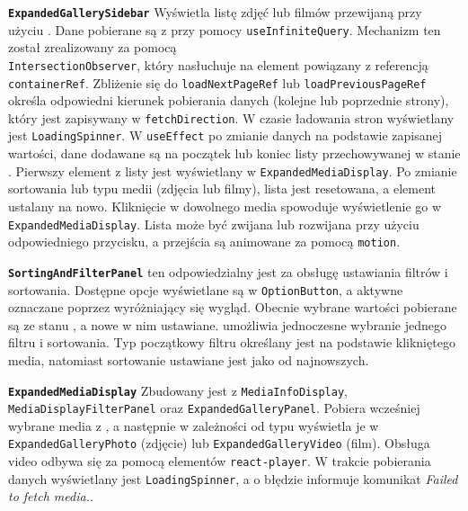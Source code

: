 \textbf{\texttt{ExpandedGallerySidebar}}
Wyświetla listę zdjęć lub filmów przewijaną przy użyciu \texttt{}.
Dane pobierane są  z  przy pomocy 
\texttt{useInfiniteQuery}.
Mechanizm ten został zrealizowany za pomocą \\ \texttt{IntersectionObserver}, który nasłuchuje na element powiązany z
referencją \newline \texttt{containerRef}.
Zbliżenie się do \texttt{loadNextPageRef} lub \texttt{loadPreviousPageRef} określa odpowiedni kierunek pobierania danych
(kolejne lub poprzednie strony), który jest zapisywany w \texttt{fetchDirection}.
W czasie ładowania stron wyświetlany jest \newline \texttt{LoadingSpinner}.
W  \texttt{useEffect} po zmianie danych na podstawie zapisanej wartości, dane dodawane
są na początek lub koniec listy przechowywanej w stanie .
Pierwszy element z listy jest wyświetlany w  \newline \texttt{ExpandedMediaDisplay}.
Po zmianie sortowania lub typu medii (zdjęcia lub filmy), lista jest resetowana, a element ustalany na nowo.
Kliknięcie w dowolnego media spowoduje wyświetlenie go w \texttt{ExpandedMediaDisplay}.
Lista może być zwijana lub rozwijana przy użyciu odpowiedniego przycisku, a przejścia są animowane za pomocą
 \texttt{motion}.

\textbf{\texttt{SortingAndFilterPanel}}
 ten odpowiedzialny jest za obsługę ustawiania filtrów i sortowania.
Dostępne opcje wyświetlane są w \texttt{OptionButton}, a aktywne oznaczane poprzez wyróżniający się wygląd.
Obecnie wybrane wartości pobierane są ze stanu , a nowe w nim ustawiane.
 umożliwia jednoczesne wybranie jednego filtru i sortowania.
Typ początkowy filtru określany jest na podstawie klikniętego media, natomiast sortowanie ustawiane jest
jako od najnowszych.


\textbf{\texttt{ExpandedMediaDisplay}}
Zbudowany jest z  \texttt{MediaInfoDisplay}, \\ \texttt{MediaDisplayFilterPanel} oraz \texttt{ExpandedGalleryPanel}.
Pobiera wcześniej wybrane media z , a następnie w zależności od typu
wyświetla je w \newline \texttt{ExpandedGalleryPhoto} (zdjęcie) lub \texttt{ExpandedGalleryVideo} (film).
Obsługa video odbywa się za pomocą elementów  \texttt{react-player}.
W trakcie pobierania danych wyświetlany jest \texttt{LoadingSpinner}, a o błędzie informuje komunikat
\emph{Failed to fetch media.}.

